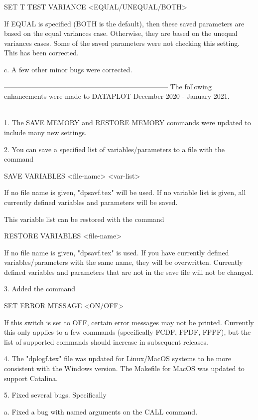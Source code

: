            SET T TEST VARIANCE <EQUAL/UNEQUAL/BOTH>

       If EQUAL is specified (BOTH is the default), then these saved
       parameters are based on the equal variances case.  Otherwise,
       they are based on the unequal variances cases.  Some of the
       saved parameters were not checking this setting.  This has been
       corrected.

    c. A few other minor bugs were corrected.

-----------------------------------------------------------------------
The following enhancements were made to DATAPLOT
December 2020 - January 2021.
-----------------------------------------------------------------------

 1. The SAVE MEMORY and RESTORE MEMORY commands were updated to
    include many new settings.

 2. You can save a specified list of variables/parameters to a
    file with the command

        SAVE VARIABLES <file-name> <var-list>

    If no file name is given, "dpsavf.tex" will be used.  If
    no variable list is given, all currently defined variables
    and parameters will be saved.

    This variable list can be restored with the command

        RESTORE VARIABLES <file-name>

    If no file name is given, "dpsavf.tex" is used.  If you
    have currently defined variables/parameters with the same
    name, they will be overwritten.  Currently defined variables
    and parameters that are not in the save file will not be
    changed.

 3. Added the command

        SET ERROR MESSAGE <ON/OFF>

    If this switch is set to OFF, certain error messages may not
    be printed.  Currently this only applies to a few commands
    (specifically FCDF, FPDF, FPPF), but the list of supported commands
    should increase in subsequent releases.

 4. The "dplogf.tex" file was updated for Linux/MacOS systems to be more
    consistent with the Windows version.  The Makefile for MacOS was
    updated to support Catalina.

 5. Fixed several bugs.  Specifically

    a. Fixed a bug with named arguments on the CALL command.

